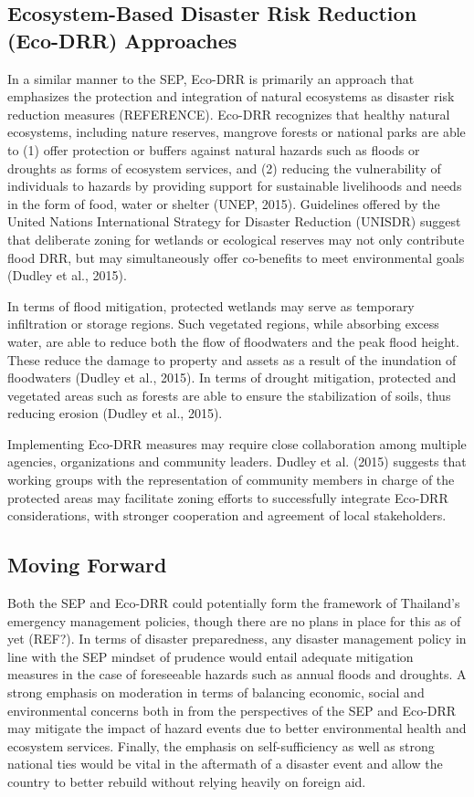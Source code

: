 \subsection{Ecosystem-Based Disaster Risk Reduction (Eco-DRR) Approaches}

In a similar manner to the SEP, Eco-DRR is primarily an approach that emphasizes the protection and integration of natural ecosystems as disaster risk reduction measures (REFERENCE). Eco-DRR recognizes that healthy natural ecosystems, including nature reserves, mangrove forests or national parks are able to (1) offer protection or buffers against natural hazards such as floods or droughts as forms of ecosystem services, and (2) reducing the vulnerability of individuals to hazards by providing support for sustainable livelihoods and needs in the form of food, water or shelter (UNEP, 2015). Guidelines offered by the United Nations International Strategy for Disaster Reduction (UNISDR) suggest that deliberate zoning for wetlands or ecological reserves may not only contribute flood DRR, but may simultaneously offer co-benefits to meet environmental goals (Dudley et al., 2015). 

In terms of flood mitigation, protected wetlands may serve as temporary infiltration or storage regions. Such vegetated regions, while absorbing excess water, are able to reduce both the flow of floodwaters and the peak flood height. These reduce the damage to property and assets as a result of the inundation of floodwaters (Dudley et al., 2015). In terms of drought mitigation, protected and vegetated areas such as forests are able to ensure the stabilization of soils, thus reducing erosion (Dudley et al., 2015).

Implementing Eco-DRR measures may require close collaboration among multiple agencies, organizations and community leaders. Dudley et al. (2015) suggests that working groups with the representation of community members in charge of the protected areas may facilitate zoning efforts to successfully integrate Eco-DRR considerations, with stronger cooperation and agreement of local stakeholders.  

\subsection{Moving Forward}

Both the SEP and Eco-DRR could potentially form the framework of Thailand's emergency management policies, though there are no plans in place for this as of yet (REF?). In terms of disaster preparedness, any disaster management policy in line with the SEP mindset of prudence would entail adequate mitigation measures in the case of foreseeable hazards such as annual floods and droughts. A strong emphasis on moderation in terms of balancing economic, social and environmental concerns both in from the perspectives of the SEP and Eco-DRR may mitigate the impact of hazard events due to better environmental health and ecosystem services. Finally, the emphasis on self-sufficiency as well as strong national ties would be vital in the aftermath of a disaster event and allow the country to better rebuild without relying heavily on foreign aid.

